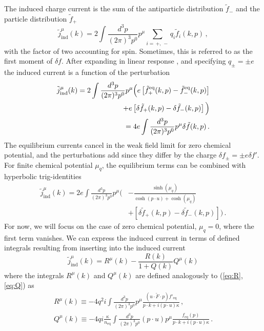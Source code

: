 The induced charge current is the sum of the antiparticle distribution $\widetilde{f}_-$ and the particle distribution $\widetilde{f}_+$
\begin{equation}\label{eq:perturbation1}
\tilde{j}_{\mathrm{ind}}^\mu(k) = 2\int \frac{d^3 p}{(2 \pi)^3 p^0}p^\mu 
\sum_{i = \, +, \, -} q_i \tilde{f}_{i}(k,p)\,,
\end{equation}
with the factor of two accounting for spin. Sometimes, this is referred to as the first moment of $\delta f$.
After expanding in linear response , and specifying $q_\pm = \pm e$ the induced current is a function of the perturbation
\begin{align}\label{eq:perturbation2}
\tilde{j}_{\mathrm{ind}}^\mu(k) = 2\int \frac{d^3 p}{(2 \pi)^3 p^0}p^\mu \Big( e \left[\tilde{f}^{\mathrm{eq}}_+(k,p)-\tilde{f}^{\mathrm{eq}}_-(k,p)\right]\notag\\
+ e\left[\delta\tilde{f}_+(k,p)-\delta\tilde{f}_-(k,p)\right]
\Big)
\notag\\
=4 e\int \frac{d^3 p}{(2 \pi)^3 p^0}p^\mu \delta\tilde{f}(k,p)
\,.
\end{align}
The equilibrium currents cancel in the weak field limit for zero chemical potential, and the perturbations add since they differ by the charge $\delta f_\pm=\pm e \delta f' $. For finite chemical potential $\mu_q$, the equilibrium terms can be combined with hyperbolic trig-identities
\begin{equation}
\begin{split}
\tilde{j}_{\mathrm{ind}}^\mu(k) 
=2 e\int \frac{d^3 p}{(2 \pi)^3 p^0}p^\mu \Big(&-\frac{\sinh{(\mu_q)}}{\cosh{(p \cdot u)}+\cosh{(\mu_q)}} \\&+  \left[\delta\tilde{f}_+(k,p)-\delta\tilde{f}_-(k,p)\right]
 \Big)
\,.
\end{split}
\end{equation}
For now, we will focus on the case of zero chemical potential, $\mu_q=0$, where the first term vanishes.
We can express the induced current in terms of defined integrals \cite{Formanek:2021blc} resulting from inserting  into the induced current
\begin{equation}\label{eq:jmu}
\widetilde{j}_{\mathrm{ind}}^\mu(k) = R^\mu(k) - \frac{R(k)}{1+Q(k)} Q^\mu(k)
\end{equation}
where the integrals $R^\mu(k)$ and $Q^\mu(k)$ are defined analogously to (\ref{eq:R},\ref{eq:Q}) as
\begin{align}
\label{eq:Rmu}R^\mu(k)  \equiv -4q^2i \int \frac{d^3p}{(2\pi)^3p^0} p^\mu \frac{(u \cdot \widetilde{F} \cdot p)f'_\mathrm{eq}}{p \cdot k + i (p \cdot u)\kappa}\,,\\
\label{eq:Qmu}Q^\mu(k) \equiv -4qi \frac{\kappa}{n_\mathrm{eq}}\int \frac{d^3p}{(2\pi)^3p^0}(p\cdot u) p^\mu \frac{f_\mathrm{eq}(p)}{p\cdot k + i(p \cdot u)\kappa}\,.
\end{align} 
